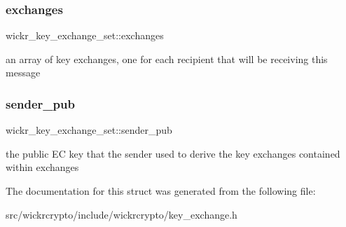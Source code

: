 \subsubsection{\texorpdfstring{exchanges}{exchanges}}
{\footnotesize\ttfamily wickr\+\_\+key\+\_\+exchange\+\_\+set\+::exchanges}

an array of key exchanges, one for each recipient that will be receiving this message \mbox{\label{structwickr__key__exchange__set_ac0b304b3014b3c7bfe181526c2f3fc37}} 
\subsubsection{\texorpdfstring{sender\+\_\+pub}{sender\_pub}}
{\footnotesize\ttfamily wickr\+\_\+key\+\_\+exchange\+\_\+set\+::sender\+\_\+pub}

the public EC key that the sender used to derive the key exchanges contained within \textquotesingle{}exchanges\textquotesingle{} 

The documentation for this struct was generated from the following file\+:\begin{DoxyCompactItemize}
\item 
src/wickrcrypto/include/wickrcrypto/key\+\_\+exchange.\+h\end{DoxyCompactItemize}
